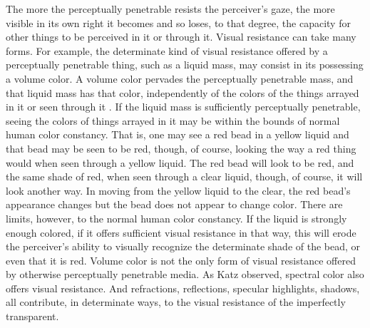 The more the perceptually penetrable resists the perceiver's gaze, the more visible in its own right it becomes and so loses, to that degree, the capacity for other things to be perceived in it or through it. Visual resistance can take many forms. For example, the determinate kind of visual resistance offered by a perceptually penetrable thing, such as a liquid mass, may consist in its possessing a volume color. A volume color pervades the perceptually penetrable mass, and that liquid mass has that color, independently of the colors of the things arrayed in it or seen through it \citep[though see][]{Mizrahi:2010aa}. If the liquid mass is sufficiently perceptually penetrable, seeing the colors of things arrayed in it may be within the bounds of normal human color constancy. That is, one may see a red bead in a yellow liquid and that bead may be seen to be red, though, of course, looking the way a red thing would when seen through a yellow liquid. The red bead will look to be red, and the same shade of red, when seen through a clear liquid, though, of course, it will look another way. In moving from the yellow liquid to the clear, the red bead's appearance changes but the bead does not appear to change color. There are limits, however, to the normal human color constancy. If the liquid is strongly enough colored, if it offers sufficient visual resistance in that way, this will erode the perceiver's ability to visually recognize the determinate shade of the bead, or even that it is red. Volume color is not the only form of visual resistance offered by otherwise perceptually penetrable media. As Katz observed, spectral color also offers visual resistance. And refractions, reflections, specular highlights, shadows, all contribute, in determinate ways, to the visual resistance of the imperfectly transparent.

